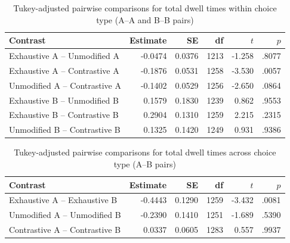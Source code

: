 \documentclass[ruler]{CUP-JNL-LIN}%
\begin{document}
\begin{table}[htbp]
\centering
\caption{Tukey-adjusted pairwise comparisons for total dwell times within choice type (A--A and B--B pairs)}
\label{tab:total-dwell-pairwise-within-choice}
\begin{tabularx}{\textwidth}{@{}Xrrrrr@{}}
\toprule
Contrast & Estimate & SE & df & $t$ & $p$ \\
\midrule
Exhaustive A -- Unmodified A   & -0.0474 & 0.0376 & 1213 & -1.258 & .8077 \\
Exhaustive A -- Contrastive A  & -0.1876 & 0.0531 & 1258 & -3.530 & .0057 \\
Unmodified A -- Contrastive A  & -0.1402 & 0.0529 & 1256 & -2.650 & .0864 \\
Exhaustive B -- Unmodified B   &  0.1579 & 0.1830 & 1239 &  0.862 & .9553 \\
Exhaustive B -- Contrastive B  &  0.2904 & 0.1310 & 1259 &  2.215 & .2315 \\
Unmodified B -- Contrastive B  &  0.1325 & 0.1420 & 1249 &  0.931 & .9386 \\
\bottomrule
\end{tabularx}
\end{table}

\begin{table}[htbp]
\centering
\caption{Tukey-adjusted pairwise comparisons for total dwell times across choice type (A--B pairs)}
\label{tab:total-dwell-pairwise-across-choice}
\begin{tabularx}{\textwidth}{@{}Xrrrrr@{}}
\toprule
Contrast & Estimate & SE & df & $t$ & $p$ \\
\midrule
Exhaustive A -- Exhaustive B   & -0.4443 & 0.1290 & 1259 & -3.432 & .0081 \\
Unmodified A -- Unmodified B   & -0.2390 & 0.1410 & 1251 & -1.689 & .5390 \\
Contrastive A -- Contrastive B &  0.0337 & 0.0605 & 1283 &  0.557 & .9937 \\
\bottomrule
\end{tabularx}
\end{table}
\end{document}

